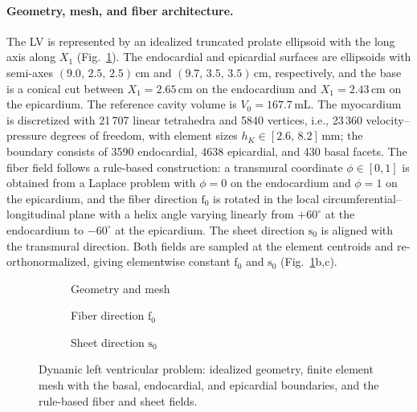 \paragraph{Geometry, mesh, and fiber architecture.}
The LV is represented by an idealized truncated prolate ellipsoid with the long axis along
$X_1$ (Fig.~\ref{fig:lv_setup}). The endocardial and epicardial surfaces are ellipsoids
with semi-axes $(9.0,\,2.5,\,2.5)$\,cm and $(9.7,\,3.5,\,3.5)$\,cm, respectively, and the
base is a conical cut between $X_1=2.65$\,cm on the endocardium and $X_1=2.43$\,cm on the
epicardium. The reference cavity volume is $V_0=167.7$\,mL. The myocardium is discretized
with 21\,707 linear tetrahedra and 5840 vertices, i.e., 23\,360 velocity--pressure degrees
of freedom, with element sizes $h_K\in[2.6,\,8.2]$\,mm; the boundary consists of 3590
endocardial, 4638 epicardial, and 430 basal facets. The fiber field follows a rule-based
construction: a transmural coordinate $\phi\in[0,1]$ is obtained from a Laplace problem with
$\phi=0$ on the endocardium and $\phi=1$ on the epicardium, and the fiber direction
$\mathrm{f}_0$ is rotated in the local circumferential--longitudinal plane with a helix
angle varying linearly from $+60^\circ$ at the endocardium to $-60^\circ$ at the epicardium.
The sheet direction $\mathrm{s}_0$ is aligned with the transmural direction. Both fields are
sampled at the element centroids and re-orthonormalized, giving elementwise constant
$\mathrm{f}_0$ and $\mathrm{s}_0$ (Fig.~\ref{fig:lv_setup}b,c).

\begin{figure}[htbp]
  \centering
  \begin{subfigure}[b]{0.32\textwidth}\centering
    \caption{Geometry and mesh}
  \end{subfigure}\hfill
  \begin{subfigure}[b]{0.32\textwidth}\centering
    \caption{Fiber direction $\mathrm{f}_0$}
  \end{subfigure}\hfill
  \begin{subfigure}[b]{0.32\textwidth}\centering
    \caption{Sheet direction $\mathrm{s}_0$}
  \end{subfigure}
  \caption{Dynamic left ventricular problem: idealized geometry, finite element mesh with the
  basal, endocardial, and epicardial boundaries, and the rule-based fiber and sheet fields.}
  \label{fig:lv_setup}
\end{figure}

